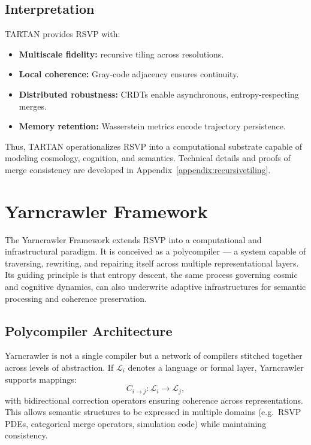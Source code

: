 \documentclass[12pt]{report}
\begin{document}
\section{Interpretation}

TARTAN provides RSVP with:
\begin{itemize}
    \item \textbf{Multiscale fidelity:} recursive tiling across resolutions.  
    \item \textbf{Local coherence:} Gray-code adjacency ensures continuity.  
    \item \textbf{Distributed robustness:} CRDTs enable asynchronous, entropy-respecting merges.  
    \item \textbf{Memory retention:} Wasserstein metrics encode trajectory persistence.  
\end{itemize}

Thus, TARTAN operationalizes RSVP into a computational substrate capable of modeling cosmology, cognition, and semantics. Technical details and proofs of merge consistency are developed in Appendix~\ref{appendix:recursivetiling}.

\chapter{Yarncrawler Framework}

The Yarncrawler Framework extends RSVP into a computational and infrastructural paradigm.  
It is conceived as a polycompiler --- a system capable of traversing, rewriting, and repairing itself across multiple representational layers. Its guiding principle is that entropy descent, the same process governing cosmic and cognitive dynamics, can also underwrite adaptive infrastructures for semantic processing and coherence preservation.

\section{Polycompiler Architecture}

Yarncrawler is not a single compiler but a network of compilers stitched together across levels of abstraction.  
If $\mathcal{L}_i$ denotes a language or formal layer, Yarncrawler supports mappings:
\[
C_{i \to j} : \mathcal{L}_i \longrightarrow \mathcal{L}_j,
\]
with bidirectional correction operators ensuring coherence across representations.  
This allows semantic structures to be expressed in multiple domains (e.g.\ RSVP PDEs, categorical merge operators, simulation code) while maintaining consistency.
\end{document}
